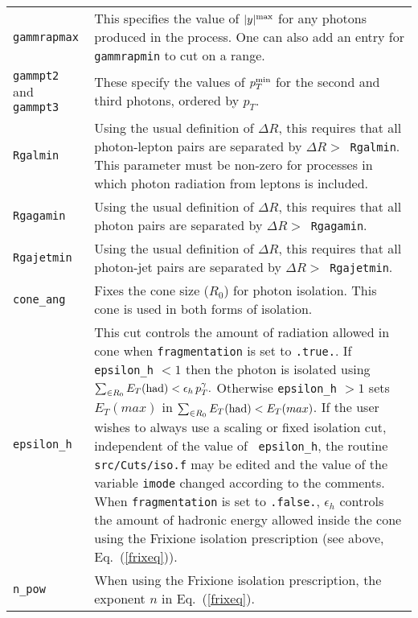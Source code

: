 \begin{longtable}{p{3.5cm}p{12cm}}
		{\tt gammrapmax} & This specifies the value
		of $|y|^{\rm max}$ for any photons produced in the process. One can also add an entry
		for \texttt{gammrapmin} to cut on a range. \\
		
		{\tt gammpt2} and {\tt gammpt3} & These specify the values
		of $p_T^{\rm min}$ for the second and third photons, ordered by $p_T$. \\
		
		{\tt Rgalmin} & Using the usual definition of $\Delta R$,
		this requires that all photon-lepton pairs are separated by
		$\Delta R >$~{\tt Rgalmin}. This parameter must be non-zero
		for processes in which photon radiation from leptons is included. \\
		
		{\tt Rgagamin} & Using the usual definition of $\Delta R$,
		this requires that all photon pairs are separated by
		$\Delta R >$~{\tt Rgagamin}. \\
		
		{\tt Rgajetmin} & Using the usual definition of $\Delta R$,
		this requires that all photon-jet pairs are separated by
		$\Delta R >$~{\tt Rgajetmin}. \\
		
		{\tt cone\_ang} & Fixes the cone size ($R_0$) for photon isolation.
		This cone is used in both forms of isolation. \\
		
		{\tt epsilon\_h} & This cut controls the amount of radiation allowed in cone when  {\tt fragmentation} is set 
		to 
		{\tt .true.}. If  {\tt epsilon\_h} $ < 1$ then the photon is isolated using
		$\sum_{\in R_0} E_T{\rm{(had)}} < \epsilon_h \, p^{\gamma}_{T}.$ Otherwise {\tt epsilon\_h}  $ > 1$ sets 
		$E_T(max)$ in  $\sum_{\in R_0} E_T{\rm{(had)}} < E_T(max)$.  
		If the user wishes to always use a scaling or fixed isolation cut, independent of the value of {\tt 
			epsilon\_h}, the routine
		{\tt src/Cuts/iso.f} may be edited and the value of the variable {\tt imode} changed according to the comments.
		When {\tt fragmentation} is set to {\tt .false.}, $\epsilon_h$ controls the amount of hadronic energy allowed 
		inside the cone using the
		Frixione isolation prescription (see above, Eq.~(\ref{frixeq})). \\
		
		{\tt n\_pow} & When using the Frixione isolation prescription, the exponent $n$ in Eq.~(\ref{frixeq}). \\
		
		\bottomrule
	\end{longtable}

